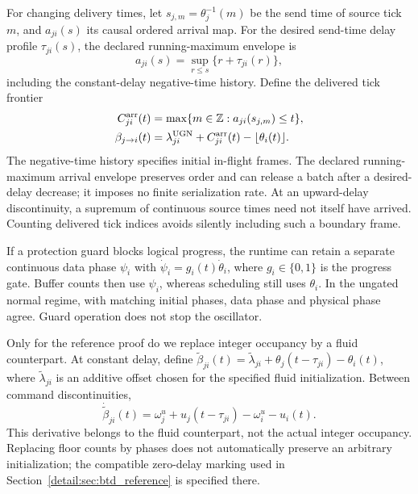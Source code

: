 For changing delivery times, let $s_{j,m}=\theta_j^{-1}(m)$ be the send
time of source tick $m$, and $a_{ji}(s)$ its causal ordered arrival map.
For the desired send-time delay profile $\tau_{ji}(s)$, the declared
running-maximum envelope is
\[
 a_{ji}(s)=\sup_{r\le s}\{r+\tau_{ji}(r)\},
\]
including the constant-delay negative-time history.
Define the delivered tick frontier
\begin{equation}
 \begin{aligned}
 C^{\rm arr}_{ji}(t)&=\max\{m\in\mathbb Z:a_{ji}(s_{j,m})\le t\},\\
 \beta_{j\to i}(t)&=\lambda^{\rm UGN}_{ji}
       +C^{\rm arr}_{ji}(t)-\lfloor\theta_i(t)\rfloor.
 \end{aligned}
 \label{detail:eq:fpd_ordered_arrivals}
\end{equation}
The negative-time history specifies initial in-flight frames. The declared
running-maximum arrival envelope preserves order and can release a batch
after a desired-delay decrease; it imposes no finite serialization rate.
At an upward-delay discontinuity, a supremum of continuous source times
need not itself have arrived. Counting delivered tick indices avoids
silently including such a boundary frame.

If a protection guard blocks logical progress, the runtime can retain a
separate continuous data phase $\psi_i$ with
$\dot\psi_i=g_i(t)\dot\theta_i$, where $g_i\in\{0,1\}$ is the progress
gate. Buffer counts then use $\psi_i$, whereas scheduling still uses
$\theta_i$. In the ungated normal regime, with matching initial phases, data phase and physical phase agree. Guard operation does not stop the oscillator.

Only for the reference proof do we replace integer occupancy by a
fluid counterpart. At constant delay, define
$\widetilde\beta_{ji}(t)=\widetilde\lambda_{ji}
+\theta_j(t-\tau_{ji})-\theta_i(t)$, where
$\widetilde\lambda_{ji}$ is an additive offset chosen for the specified
fluid initialization. Between command discontinuities,
\begin{equation}
 \dot{\widetilde\beta}_{ji}(t)
 =\omega_j^u+u_j(t-\tau_{ji})-\omega_i^u-u_i(t).
 \label{detail:eq:fpi_fluid_counterpart}
\end{equation}
This derivative belongs to the fluid counterpart, not the actual integer
occupancy. Replacing floor counts by phases does not automatically preserve
an arbitrary initialization; the compatible zero-delay marking used in
Section~\ref{detail:sec:btd_reference} is specified there.

